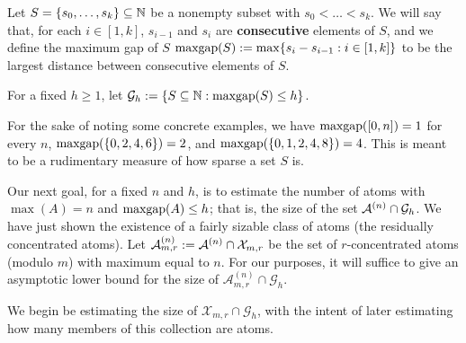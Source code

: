 \begin{defn} \label{def:maxgap}
Let $S = \{s_0,\dots, s_k\} \subseteq \mathbb{N}$ be a nonempty subset with $s_0 < \dots < s_k$.
We will say that, for each $i\in [1,k]$, $s_{i-1}$ and $s_i$ are \textbf{consecutive} elements of $S$, and we define the maximum gap of $S$ $\operatorname{maxgap}(S) := \max \{s_i - s_{i-1} : i\in [1,k]\}$ to be the largest distance between consecutive elements of $S$.

For a fixed $h\ge 1$, let $\mathcal{G}_h := \{S\subseteq \mathbb{N}: \operatorname{maxgap}(S) \le h\}$.
\end{defn}

For the sake of noting some concrete examples, we have $\operatorname{maxgap}([0,n]) = 1$ for every $n$, $\operatorname{maxgap}(\{0,2,4,6\}) = 2$, and $\operatorname{maxgap}(\{0,1,2,4,8\}) = 4$.
This is meant to be a rudimentary measure of how sparse a set $S$ is.

Our next goal, for a fixed $n$ and $h$, is to estimate the number of atoms with $\max(A) = n$ and $\operatorname{maxgap}(A) \le h$; that is, the size of the set $\mathcal{A}^{(n)}\cap \mathcal{G}_h$.
We have just shown the existence of a fairly sizable class of atoms (the residually concentrated atoms).  
Let $\mathcal{A}_{m,r}^{(n)} := \mathcal{A}^{(n)} \cap \mathcal{X}_{m,r}$ be the set of $r$-concentrated atoms (modulo $m$) with maximum equal to $n$.
For our purposes, it will suffice to give an asymptotic lower bound for the size of $\mathcal{A}_{m,r}^{(n)}\cap \mathcal{G}_h$.

We begin be estimating the size of $\mathcal{X}_{m,r}\cap \mathcal{G}_h$, with the intent of later estimating how many members of this collection are atoms.

